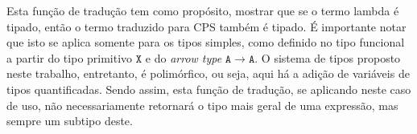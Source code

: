 \phantom{Newline}

\noindent Esta função de tradução tem como propósito, mostrar que se o termo lambda é tipado, então o termo traduzido para CPS também é tipado.
É importante notar que isto se aplica somente para os tipos simples, como definido no tipo funcional a partir do tipo primitivo $\mathtt{X}$ e do \textit{arrow type} $\mathtt{A \to A}$.
O sistema de tipos proposto neste trabalho, entretanto, é polimórfico, ou seja, aqui há a adição de variáveis de tipos quantificadas.
Sendo assim, esta função de tradução, se aplicando neste caso de uso, não necessariamente retornará o tipo mais geral de uma expressão, mas sempre um subtipo deste.

